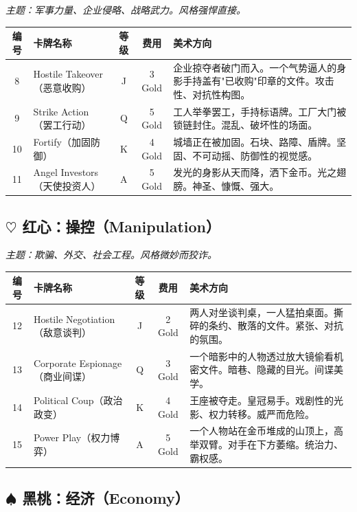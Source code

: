 \documentclass[a4paper,11pt]{article}
\begin{document}
\textit{主题：军事力量、企业侵略、战略武力。风格强悍直接。}

\begin{longtable}{@{} c p{2.2cm} c c p{5.3cm} @{}}
\toprule
\textbf{编号} & \textbf{卡牌名称} & \textbf{等级} & \textbf{费用} & \textbf{美术方向} \\
\midrule
\endhead
8 & Hostile Takeover（恶意收购） & J & 3 Gold & 企业掠夺者破门而入。一个气势逼人的身影手持盖有"已收购"印章的文件。攻击性、对抗性构图。 \\
\midrule
9 & Strike Action（罢工行动） & Q & 5 Gold & 工人举拳罢工，手持标语牌。工厂大门被锁链封住。混乱、破坏性的场面。 \\
\midrule
10 & Fortify（加固防御） & K & 4 Gold & 城墙正在被加固。石块、路障、盾牌。坚固、不可动摇、防御性的视觉感。 \\
\midrule
11 & Angel Investors（天使投资人） & A & 5 Gold & 发光的身影从天而降，洒下金币。光之翅膀。神圣、慷慨、强大。 \\
\bottomrule
\end{longtable}

\subsection*{$\heartsuit$ 红心：操控（Manipulation）}

\textit{主题：欺骗、外交、社会工程。风格微妙而狡诈。}

\begin{longtable}{@{} c p{2.2cm} c c p{5.3cm} @{}}
\toprule
\textbf{编号} & \textbf{卡牌名称} & \textbf{等级} & \textbf{费用} & \textbf{美术方向} \\
\midrule
\endhead
12 & Hostile Negotiation（敌意谈判） & J & 2 Gold & 两人对坐谈判桌，一人猛拍桌面。撕碎的条约、散落的文件。紧张、对抗的氛围。 \\
\midrule
13 & Corporate Espionage（商业间谍） & Q & 3 Gold & 一个暗影中的人物透过放大镜偷看机密文件。暗巷、隐藏的目光。间谍美学。 \\
\midrule
14 & Political Coup（政治政变） & K & 4 Gold & 王座被夺走。皇冠易手。戏剧性的光影、权力转移。威严而危险。 \\
\midrule
15 & Power Play（权力博弈） & A & 5 Gold & 一个人物站在金币堆成的山顶上，高举双臂。对手在下方萎缩。统治力、霸权感。 \\
\bottomrule
\end{longtable}

\newpage

\subsection*{$\spadesuit$ 黑桃：经济（Economy）}
\end{document}
